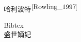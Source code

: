 \documentclass[12pt]{article}
\begin{document}
    哈利波特$^{\cite{Rowling_1997}}$

%
%

    Bibtex \\

    盛世嫡妃\cite{Rowling_1997}



    
    
\end{document}
